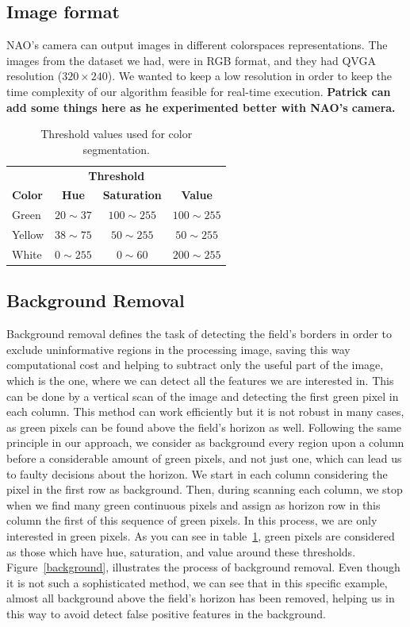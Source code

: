 \documentclass[	DIV=calc,%
							paper=a4,%
							fontsize=9pt,%
							twocolumn]{scrartcl}	 					%
\begin{document}
\subsection{Image format}
NAO's camera can output images in different colorspaces representations. The images from the dataset we had, were in RGB format, and they had QVGA resolution ($320 \times 240$). We wanted to keep a low resolution in order to keep the time complexity of our algorithm feasible for real-time execution. \textbf{Patrick can add some things here as he experimented better with NAO's camera.}

\begin{table}
\begin{center}
\caption{Threshold values used for color segmentation.}
\label{thresholdHSV}
\begin{tabular}{lccc}
\toprule
\multicolumn{4}{c}{\textbf{Threshold}} \\
\cmidrule(r){2-4}
\textbf{Color}   & \textbf{Hue} & \textbf{Saturation} & \textbf{Value} \\
\midrule
Green      & $20 \sim 37$    & $100 \sim 255$    & $100 \sim 255$    \\
Yellow      & $38 \sim 75$    & $50 \sim 255$    & $50 \sim 255$    \\
White     & $0 \sim 255$    & $0 \sim 60$    & $200 \sim 255$    \\
\bottomrule
\end{tabular}
\end{center}
\end{table}

\subsection{Background Removal}
Background removal defines the task of detecting the field's borders in order to exclude uninformative regions in the processing image, saving this way computational cost and helping to subtract only the useful part of the image, which is the one, where we can detect all the features we are interested in. This can be done by a vertical scan of the image and detecting the first green pixel in each column. This method can work efficiently but it is not robust in many cases, as green pixels can be found above the field's horizon as well. Following the same principle in our approach, we consider as background every region upon a column before a considerable amount of green pixels, and not just one, which can lead us to faulty decisions about the horizon. We start in each column considering the pixel in the first row as background. Then, during scanning each column, we stop when we find many green continuous pixels and assign as horizon row in this column the first of this sequence of green pixels. In this process, we are only interested in green pixels. As you can see in table~\ref{thresholdHSV}, green pixels are considered as those which have hue, saturation, and value around these thresholds. Figure~\ref{background}, illustrates the process of background removal. Even though it is not such a sophisticated method, we can see that in this specific example, almost all background above the field's horizon has been removed, helping us in this way to avoid detect false positive features in the background.
\end{document}
